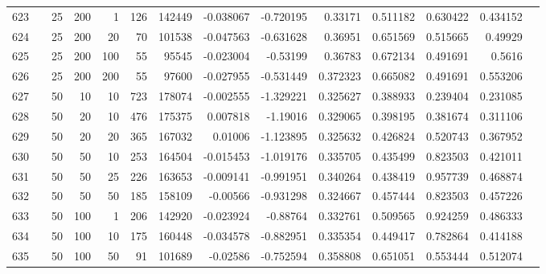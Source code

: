 \begin{longtable}{llrrrrrrrrrrrr}
		623 & &           25 &               200 &            1 &         126 &     142449 & -0.038067 & -0.720195 &   0.33171 &    0.511182 &       0.630422 &  0.434152 \\
		624 & &           25 &               200 &           20 &          70 &     101538 & -0.047563 & -0.631628 &   0.36951 &    0.651569 &       0.515665 &   0.49929 \\
		625 & &           25 &               200 &          100 &          55 &      95545 & -0.023004 &  -0.53199 &   0.36783 &    0.672134 &       0.491691 &    0.5616 \\
		626 & &           25 &               200 &          200 &          55 &      97600 & -0.027955 & -0.531449 &  0.372323 &    0.665082 &       0.491691 &  0.553206 \\
		627 & &           50 &                10 &           10 &         723 &     178074 & -0.002555 & -1.329221 &  0.325627 &    0.388933 &       0.239404 &  0.231085 \\
		628 & &           50 &                20 &           10 &         476 &     175375 &  0.007818 &  -1.19016 &  0.329065 &    0.398195 &       0.381674 &  0.311106 \\
		629 & &           50 &                20 &           20 &         365 &     167032 &   0.01006 & -1.123895 &  0.325632 &    0.426824 &       0.520743 &  0.367952 \\
		630 & &           50 &                50 &           10 &         253 &     164504 & -0.015453 & -1.019176 &  0.335705 &    0.435499 &       0.823503 &  0.421011 \\
		631 & &           50 &                50 &           25 &         226 &     163653 & -0.009141 & -0.991951 &  0.340264 &    0.438419 &       0.957739 &  0.468874 \\
		632 & \multirow[b]{9}{*}{\rotatebox[origin=l]{90}{use-lexrank-weighted}} &           50 &                50 &           50 &         185 &     158109 &  -0.00566 & -0.931298 &  0.324667 &    0.457444 &       0.823503 &  0.457226 \\
		633 & &           50 &               100 &            1 &         206 &     142920 & -0.023924 &  -0.88764 &  0.332761 &    0.509565 &       0.924259 &  0.486333 \\
		634 & &           50 &               100 &           10 &         175 &     160448 & -0.034578 & -0.882951 &  0.335354 &    0.449417 &       0.782864 &  0.414188 \\
		635 & &           50 &               100 &           50 &          91 &     101689 &  -0.02586 & -0.752594 &  0.358808 &    0.651051 &       0.553444 &  0.512074 \\

\end{longtable}
